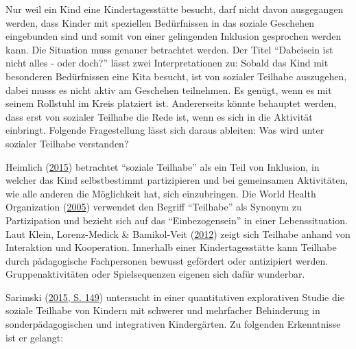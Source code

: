 \documentclass[
  ngerman,
  11pt,
  paper=a4,
  twoside,
  titlepage=true,
  openright,
  abstract=on,
  toc=listofnumbered,
  numbers=noenddot,
  chapterprefix=true,
  headings=optiontohead,
  svgnames,
  dvipsnames]{scrreprt}
\begin{document}
Nur weil ein Kind eine Kindertagesstätte besucht, darf nicht davon
ausgegangen werden, dass Kinder mit speziellen Bedürfnissen in das
soziale Geschehen eingebunden sind und somit von einer gelingenden
Inklusion gesprochen werden kann. Die Situation muss genauer betrachtet
werden. Der Titel “Dabeisein ist nicht alles - oder doch?” lässt zwei
Interpretationen zu: Sobald das Kind mit besonderen Bedürfnissen eine
Kita besucht, ist von sozialer Teilhabe auszugehen, dabei musss es nicht
aktiv am Geschehen teilnehmen. Es genügt, wenn es mit seinem Rollstuhl
im Kreis platziert ist. Andererseits könnte behauptet werden, dass erst
von sozialer Teilhabe die Rede ist, wenn es sich in die Aktivität
einbringt. Folgende Fragestellung lässt sich daraus ableiten: Was wird
unter sozialer Teilhabe verstanden?

Heimlich (\protect\hyperlink{ref-inklusionQualituxe4t_Heimlich}{2015})
betrachtet “soziale Teilhabe” als ein Teil von Inklusion, in welcher das
Kind selbstbestimmt partizipieren und bei gemeinsamen Aktivitäten, wie
alle anderen die Möglichkeit hat, sich einzubringen. Die World Health
Organization (\protect\hyperlink{ref-worldhealthorganisation}{2005})
verwendet den Begriff “Teilhabe” als Synonym zu Partizipation und
bezieht sich auf das “Einbezogensein” in einer Lebenssituation. Laut
Klein, Lorenz-Medick \& Bamikol-Veit
(\protect\hyperlink{ref-kleineva}{2012}) zeigt sich Teilhabe anhand von
Interaktion und Kooperation. Innerhalb einer Kindertagesstätte kann
Teilhabe durch pädagogische Fachpersonen bewusst gefördert oder
antizipiert werden. Gruppenaktivitäten oder Spielsequenzen eigenen sich
dafür wunderbar.

Sarimski (\protect\hyperlink{ref-dabeiseinIstNichtAllesOderDoch}{2015,
S. 149}) untersucht in einer quantitativen explorativen Studie die
soziale Teilhabe von Kindern mit schwerer und mehrfacher Behinderung in
sonderpädagogischen und integrativen Kindergärten. Zu folgenden
Erkenntnisse ist er gelangt:
\end{document}
